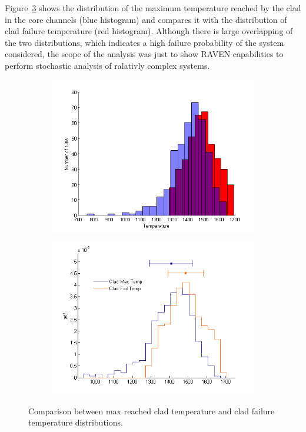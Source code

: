 \documentclass{mc2013}
\begin{document}
Figure~\ref{fig:distributionResults} shows the distribution of the maximum temperature reached by the clad in the core channels (blue histogram) and compares it with the distribution of clad failure temperature (red histogram).
Although there is large overlapping of the two distributions, which indicates a high failure probability of the system considered, the scope of the analysis was just to show  RAVEN capabilities to perform stochastic analysis of ralativly complex systems.
\begin{figure} [H]
\centering
\begin{subfigure}{.5\textwidth}
  \centering
  \includegraphics[width=1\linewidth]{figures/PRA_dist1.png}
  \label{fig:runs_temp_dist}
\end{subfigure}%
\begin{subfigure}{.5\textwidth}
  \centering
  \includegraphics[width=1\linewidth]{figures/PRA_dist2.png}
  \label{fig:pdf_temp}
\end{subfigure}
\caption{Comparison between max reached clad temperature and clad failure temperature distributions.}
\label{fig:distributionResults}
\end{figure}
\end{document}
